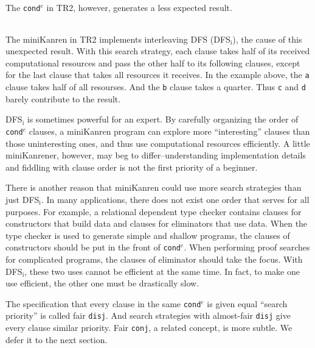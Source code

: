 \documentclass[format=acmlarge, review=true, authordraft=true]{acmart}
\newcommand{\conde}{\texttt{cond$^e$}}
\newcommand{\conj}{\texttt{conj}}
\newcommand{\disj}{\texttt{disj}}
\newcommand{\clisting}[1]{
\begin{center}
  \begin{tabular}{c}
	
    \end{tabular}
\end{center}
}
\newcommand{\DFSi }[0]{DFS$_\textrm{i}$}
\begin{document}
\clisting{Figures/run-repeato-fair.rkt}

The \conde{} in TR2, however, generates a less expected result.

\clisting{Figures/run-repeato-idfs.rkt}

The miniKanren in TR2 implements interleaving DFS (\DFSi), the cause of this 
unexpected result. With this search strategy, each clause takes half 
of its received computational resources and pass the other half to its 
following clauses, except for the last clause that takes all resources it 
receives. In the example above, the \texttt{a} clause takes half of all 
resourses. And the \texttt{b} clause takes a quarter. Thus \texttt{c} and 
\texttt{d} barely contribute to the result.


\DFSi{} is sometimes powerful for an expert. By carefully organizing the order 
of \conde{} clauses, a miniKanren program can explore more ``interesting'' 
clauses than those uninteresting ones, and thus use computational resources 
efficiently. A little miniKanrener, however, may beg to differ--understanding
implementation details and fiddling with clause order is not the first
priority of a beginner.

There is another reason that miniKanren could use more search strategies than
just \DFSi. In many applications, there does not exist one order that serves
for all purposes. For example, a relational dependent type checker contains
clauses for constructors that build data and clauses for eliminators that use
data. When the type checker is used to generate simple and shallow programs,
the clauses of constructors should be put in the front of \conde.
When performing proof searches for complicated programs, the clauses of 
eliminator should take the focus. With \DFSi, these two uses cannot be 
efficient at the same time. In fact, to make one use efficient, the other one 
must be drastically slow.

The specification that every clause in the same \conde{} is given equal 
``search priority'' is called fair \disj{}. And search strategies with 
almost-fair \disj{} give every clause similar priority. 
Fair \conj{}, a related concept, is more subtle. We defer it to the next 
section.
\end{document}

